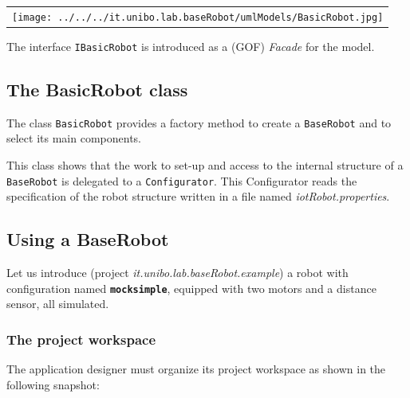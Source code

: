 \begin{center}
\begin{tabular}{ c }
     \texttt{[image: ../../../it.unibo.lab.baseRobot/umlModels/BasicRobot.jpg]}\\
\end{tabular} 
\end{center}

The interface \texttt{IBasicRobot} is introduced as a (GOF) \textit{Facade} for the model.


\subsection{The BasicRobot class}

The class \texttt{BasicRobot} provides a factory method to create a \texttt{BaseRobot} and to select its main components.



This class shows that the work to set-up and access to the internal structure of a \texttt{BaseRobot} is delegated to a  \texttt{Configurator}. This Configurator reads the specification of the robot structure written in a file named \textit{iotRobot.properties}.   



\subsection{Using a BaseRobot}

Let us introduce (project \textit{it.unibo.lab.baseRobot.example}) a robot with configuration named \texttt{\textbf{mocksimple}}, equipped with two motors and a distance sensor, all simulated. 

\subsubsection{The project workspace}

The application designer must organize its project workspace as shown in the following snapshot:

